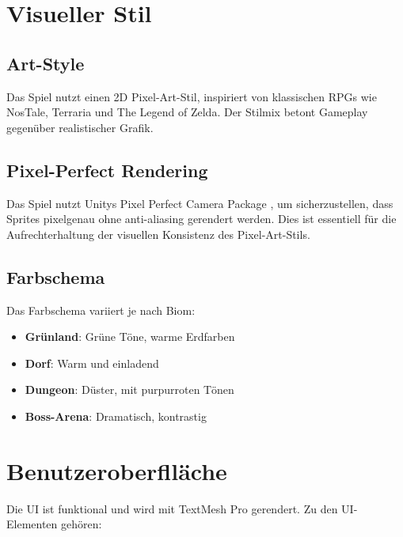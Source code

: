 \documentclass[
  a4paper,
  11pt,
  ngerman,
  parskip=half,
  bibliography=totoc,
  listof=totoc
]{scrreprt}
\begin{document}
\section{Visueller Stil}

\subsection{Art-Style}

Das Spiel nutzt einen 2D Pixel-Art-Stil, inspiriert von klassischen RPGs wie NosTale, Terraria und The Legend of Zelda. Der Stilmix betont Gameplay gegenüber realistischer Grafik.

\subsection{Pixel-Perfect Rendering}

Das Spiel nutzt Unitys Pixel Perfect Camera Package \cite{unity_2d_pixel_perfect}, um sicherzustellen, dass Sprites pixelgenau ohne anti-aliasing gerendert werden. Dies ist essentiell für die Aufrechterhaltung der visuellen Konsistenz des Pixel-Art-Stils.

\subsection{Farbschema}

Das Farbschema variiert je nach Biom:
\begin{itemize}
    \item \textbf{Grünland}: Grüne Töne, warme Erdfarben
    \item \textbf{Dorf}: Warm und einladend
    \item \textbf{Dungeon}: Düster, mit purpurroten Tönen
    \item \textbf{Boss-Arena}: Dramatisch, kontrastig
\end{itemize}

\section{Benutzeroberflläche}

Die UI ist funktional und wird mit TextMesh Pro \cite{unity_textmesh_pro} gerendert. Zu den UI-Elementen gehören:
\end{document}
